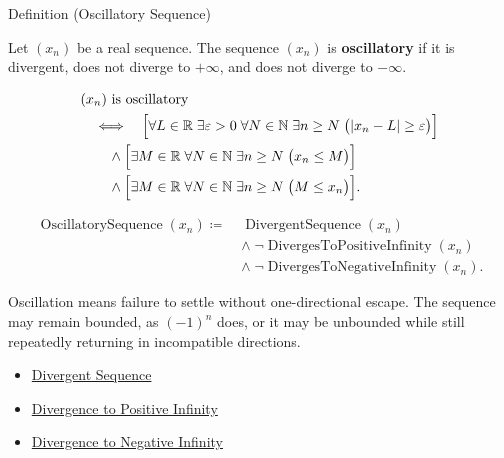 
\begin{definitionbox}{Definition (Oscillatory Sequence)}
\begin{definition}
\label{def:oscillatory-sequence}
Let $(x_n)$ be a real sequence. The sequence $(x_n)$ is
\textbf{oscillatory} if it is divergent, does not diverge to $+\infty$,
and does not diverge to $-\infty$.
\end{definition}
\end{definitionbox}

\begin{remark*}
\[
\begin{aligned}
&(x_n)\text{ is oscillatory}\\
&\quad\Longleftrightarrow\quad
\Bigl[
  \forall L\in\mathbb{R}\;\exists \varepsilon>0\;\forall N\in\mathbb{N}
  \;\exists n\ge N\;\bigl(|x_n-L|\ge\varepsilon\bigr)
\Bigr]\\
&\qquad\land
\Bigl[
  \exists M\in\mathbb{R}\;\forall N\in\mathbb{N}\;\exists n\ge N
  \;\bigl(x_n\le M\bigr)
\Bigr]\\
&\qquad\land
\Bigl[
  \exists M\in\mathbb{R}\;\forall N\in\mathbb{N}\;\exists n\ge N
  \;\bigl(M\le x_n\bigr)
\Bigr].
\end{aligned}
\]
\end{remark*}

\begin{remark*}
\[
\begin{aligned}
\operatorname{OscillatorySequence}(x_n)
\coloneqq\;&
\operatorname{DivergentSequence}(x_n)\\
&\land\;\neg\operatorname{DivergesToPositiveInfinity}(x_n)\\
&\land\;\neg\operatorname{DivergesToNegativeInfinity}(x_n).
\end{aligned}
\]
\end{remark*}

\begin{remark*}[Interpretation]
Oscillation means failure to settle without one-directional escape. The
sequence may remain bounded, as $(-1)^n$ does, or it may be unbounded while
still repeatedly returning in incompatible directions.
\end{remark*}

\begin{remark*}[Dependencies]\hfill
\begin{itemize}
  \item \hyperref[def:divergent-sequence]{Divergent Sequence}
  \item \hyperref[def:diverges-to-positive-infinity]{Divergence to Positive Infinity}
  \item \hyperref[def:diverges-to-negative-infinity]{Divergence to Negative Infinity}
\end{itemize}
\end{remark*}

